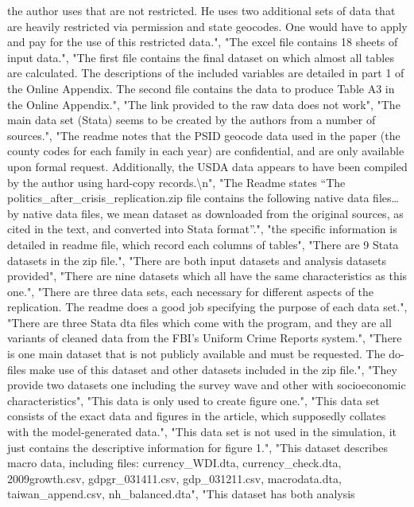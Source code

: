 \documentclass[]{article}
\begin{document}
\begin{itemize}
  the author uses that are not restricted. He uses two additional sets
  of data that are heavily restricted via permission and state geocodes.
  One would have to apply and pay for the use of this restricted data.",
  "The excel file contains 18 sheets of input data.", "The first file
  contains the final dataset on which almost all tables are calculated.
  The descriptions of the included variables are detailed in part 1 of
  the Online Appendix. The second file contains the data to produce
  Table A3 in the Online Appendix.", "The link provided to the raw data
  does not work", "The main data set (Stata) seems to be created by the
  authors from a number of sources.", "The readme notes that the PSID
  geocode data used in the paper (the county codes for each family in
  each year) are confidential, and are only available upon formal
  request. Additionally, the USDA data appears to have been compiled by
  the author using hard-copy records.\textbackslash{}n", "The Readme
  states ``The politics\_after\_crisis\_replication.zip file contains
  the following native data files\ldots{} by native data files, we mean
  dataset as downloaded from the original sources, as cited in the text,
  and converted into Stata format''.", "the specific information is
  detailed in readme file, which record each columns of tables", "There
  are 9 Stata datasets in the zip file.", "There are both input datasets
  and analysis datasets provided", "There are nine datasets which all
  have the same characteristics as this one.", "There are three data
  sets, each necessary for different aspects of the replication. The
  readme does a good job specifying the purpose of each data set.",
  "There are three Stata dta files which come with the program, and they
  are all variants of cleaned data from the FBI's Uniform Crime Reports
  system.", "There is one main dataset that is not publicly available
  and must be requested. The do-files make use of this dataset and other
  datasets included in the zip file.", "They provide two datasets one
  including the survey wave and other with socioeconomic
  characteristics", "This data is only used to create figure one.",
  "This data set consists of the exact data and figures in the article,
  which supposedly collates with the model-generated data.", "This data
  set is not used in the simulation, it just contains the descriptive
  information for figure 1.", "This dataset describes macro data,
  including files: currency\_WDI.dta, currency\_check.dta,
  2009growth.csv, gdpgr\_031411.csv, gdp\_031211.csv, macrodata.dta,
  taiwan\_append.csv, nh\_balanced.dta", "This dataset has both analysis

\end{itemize}
\end{document}
